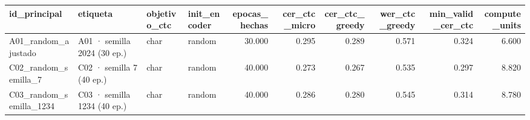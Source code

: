 \begin{tabular}{llllrrrrrr}
\toprule
id_principal & etiqueta & objetivo_ctc & init_encoder & epocas_hechas & cer_ctc_micro & cer_ctc_greedy & wer_ctc_greedy & min_valid_cer_ctc & compute_units \\
\midrule
A01_random_ajustado & A01 · semilla 2024 (30 ep.) & char & random & 30.000 & 0.295 & 0.289 & 0.571 & 0.324 & 6.600 \\
C02_random_semilla_7 & C02 · semilla 7 (40 ep.) & char & random & 40.000 & 0.273 & 0.267 & 0.535 & 0.297 & 8.820 \\
C03_random_semilla_1234 & C03 · semilla 1234 (40 ep.) & char & random & 40.000 & 0.286 & 0.280 & 0.545 & 0.314 & 8.780 \\
\bottomrule
\end{tabular}
